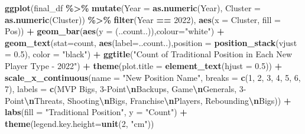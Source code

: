\documentclass[
]{article}
\newenvironment{Shaded}{\begin{snugshade}}{\end{snugshade}}
\newcommand{\AttributeTok}[1]{\textcolor[rgb]{0.13,0.29,0.53}{#1}}
\newcommand{\DecValTok}[1]{\textcolor[rgb]{0.00,0.00,0.81}{#1}}
\newcommand{\FloatTok}[1]{\textcolor[rgb]{0.00,0.00,0.81}{#1}}
\newcommand{\FunctionTok}[1]{\textcolor[rgb]{0.13,0.29,0.53}{\textbf{#1}}}
\newcommand{\NormalTok}[1]{#1}
\newcommand{\SpecialCharTok}[1]{\textcolor[rgb]{0.81,0.36,0.00}{\textbf{#1}}}
\newcommand{\StringTok}[1]{\textcolor[rgb]{0.31,0.60,0.02}{#1}}
\begin{document}
\begin{Shaded}
\begin{Highlighting}[]
\FunctionTok{ggplot}\NormalTok{(final\_df }\SpecialCharTok{\%\textgreater{}\%} 
         \FunctionTok{mutate}\NormalTok{(}\AttributeTok{Year =} \FunctionTok{as.numeric}\NormalTok{(Year),}
                \AttributeTok{Cluster =} \FunctionTok{as.numeric}\NormalTok{(Cluster)) }\SpecialCharTok{\%\textgreater{}\%}
         \FunctionTok{filter}\NormalTok{(Year }\SpecialCharTok{==} \DecValTok{2022}\NormalTok{),}
       \FunctionTok{aes}\NormalTok{(}\AttributeTok{x =}\NormalTok{ Cluster, }\AttributeTok{fill =}\NormalTok{ Pos)) }\SpecialCharTok{+}
  \FunctionTok{geom\_bar}\NormalTok{(}\FunctionTok{aes}\NormalTok{(}\AttributeTok{y =}\NormalTok{ (..count..)),}\AttributeTok{colour=}\StringTok{"white"}\NormalTok{) }\SpecialCharTok{+}
  \FunctionTok{geom\_text}\NormalTok{(}\AttributeTok{stat=}\StringTok{\textquotesingle{}count\textquotesingle{}}\NormalTok{, }\FunctionTok{aes}\NormalTok{(}\AttributeTok{label=}\NormalTok{..count..),}\AttributeTok{position =} \FunctionTok{position\_stack}\NormalTok{(}\AttributeTok{vjust =} \FloatTok{0.5}\NormalTok{), }\AttributeTok{color =} \StringTok{"black"}\NormalTok{) }\SpecialCharTok{+}
  \FunctionTok{ggtitle}\NormalTok{(}\StringTok{"Count of Traditional Position in Each New Player Type {-} 2022"}\NormalTok{) }\SpecialCharTok{+}
  \FunctionTok{theme}\NormalTok{(}\AttributeTok{plot.title =} \FunctionTok{element\_text}\NormalTok{(}\AttributeTok{hjust =} \FloatTok{0.5}\NormalTok{)) }\SpecialCharTok{+}
  \FunctionTok{scale\_x\_continuous}\NormalTok{(}\AttributeTok{name =} \StringTok{"New Position Name"}\NormalTok{, }\AttributeTok{breaks =} \FunctionTok{c}\NormalTok{(}\DecValTok{1}\NormalTok{, }\DecValTok{2}\NormalTok{, }\DecValTok{3}\NormalTok{, }\DecValTok{4}\NormalTok{, }\DecValTok{5}\NormalTok{, }\DecValTok{6}\NormalTok{, }\DecValTok{7}\NormalTok{),}
                     \AttributeTok{labels =} \FunctionTok{c}\NormalTok{(}\StringTok{\textquotesingle{}MVP Bigs\textquotesingle{}}\NormalTok{, }\StringTok{\textquotesingle{}3{-}Point}\SpecialCharTok{\textbackslash{}n}\StringTok{Backups\textquotesingle{}}\NormalTok{, }\StringTok{\textquotesingle{}Game}\SpecialCharTok{\textbackslash{}n}\StringTok{Generals\textquotesingle{}}\NormalTok{, }\StringTok{\textquotesingle{}3{-}Point}\SpecialCharTok{\textbackslash{}n}\StringTok{Threats\textquotesingle{}}\NormalTok{, }\StringTok{\textquotesingle{}Shooting}\SpecialCharTok{\textbackslash{}n}\StringTok{Bigs\textquotesingle{}}\NormalTok{, }\StringTok{\textquotesingle{}Franchise}\SpecialCharTok{\textbackslash{}n}\StringTok{Players\textquotesingle{}}\NormalTok{, }\StringTok{\textquotesingle{}Rebounding}\SpecialCharTok{\textbackslash{}n}\StringTok{Bigs\textquotesingle{}}\NormalTok{)) }\SpecialCharTok{+}
  \FunctionTok{labs}\NormalTok{(}\AttributeTok{fill =} \StringTok{"Traditional Position"}\NormalTok{, }\AttributeTok{y =} \StringTok{"Count"}\NormalTok{) }\SpecialCharTok{+}
  \FunctionTok{theme}\NormalTok{(}\AttributeTok{legend.key.height=}\FunctionTok{unit}\NormalTok{(}\DecValTok{2}\NormalTok{, }\StringTok{"cm"}\NormalTok{))}
\end{Highlighting}
\end{Shaded}
\end{document}
